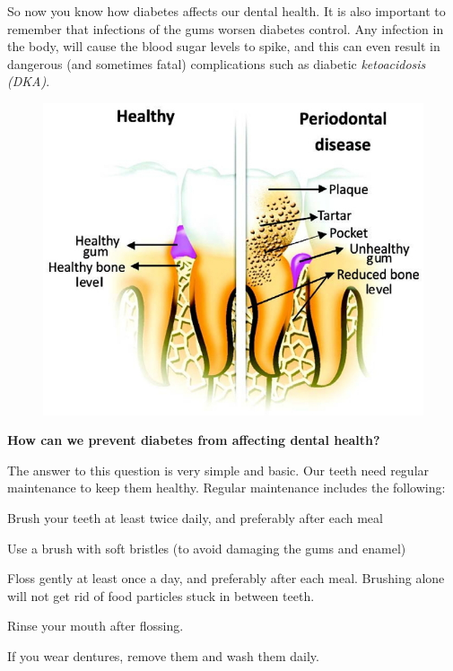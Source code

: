 So now you know how diabetes affects our dental health. It is also important to remember that infections of the gums worsen diabetes control. Any infection in the body, will cause the blood sugar levels to spike, and this can even result in dangerous (and sometimes fatal) complications such as diabetic \textit{ketoacidosis (DKA)}.

\begin{figure}
\includegraphics{images/073.jpg}
\end{figure}

\textbf{How can we prevent diabetes from affecting dental health?}

The answer to this question is very simple and basic. Our teeth need regular maintenance to keep them healthy. Regular maintenance includes the following:

\item Brush your teeth at least twice daily, and preferably after each meal

 \item Use a brush with soft bristles (to avoid damaging the gums and enamel)

 \item Floss gently at least once a day, and preferably after each meal. Brushing alone will not get rid of food particles stuck in between teeth.

 \item Rinse your mouth after flossing.

 \item If you wear dentures, remove them and wash them daily.

